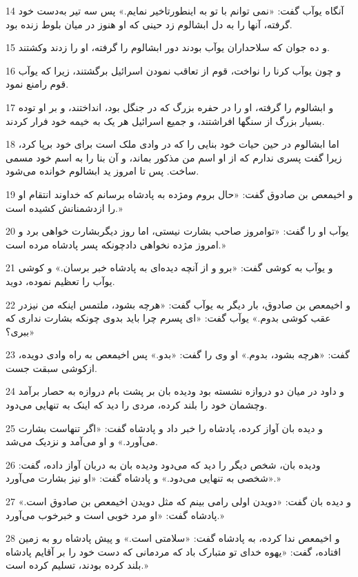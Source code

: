 \par 14 آنگاه یوآب گفت: «نمی توانم با تو به اینطورتاخیر نمایم.» پس سه تیر به‌دست خود گرفته، آنها را به دل ابشالوم زد حینی که او هنوز در میان بلوط زنده بود.
\par 15 و ده جوان که سلاحداران یوآب بودند دور ابشالوم را گرفته، او را زدند وکشتند.
\par 16 و چون یوآب کرنا را نواخت، قوم از تعاقب نمودن اسرائیل برگشتند، زیرا که یوآب قوم رامنع نمود.
\par 17 و ابشالوم را گرفته، او را در حفره بزرگ که در جنگل بود، انداختند، و بر او توده بسیار بزرگ از سنگها افراشتند، و جمیع اسرائیل هر یک به خیمه خود فرار کردند.
\par 18 اما ابشالوم در حین حیات خود بنایی را که در وادی ملک است برای خود برپا کرد، زیرا گفت پسری ندارم که از او اسم من مذکور بماند، و آن بنا را به اسم خود مسمی ساخت. پس تا امروز ید ابشالوم خوانده می‌شود.
\par 19 و اخیمعص بن صادوق گفت: «حال بروم ومژده به پادشاه برسانم که خداوند انتقام او را ازدشمنانش کشیده است.»
\par 20 یوآب او را گفت: «توامروز صاحب بشارت نیستی، اما روز دیگربشارت خواهی برد و امروز مژده نخواهی دادچونکه پسر پادشاه مرده است.»
\par 21 و یوآب به کوشی گفت: «برو و از آنچه دیده‌ای به پادشاه خبر برسان.» و کوشی یوآب را تعظیم نموده، دوید.
\par 22 و اخیمعص بن صادوق، بار دیگر به یوآب گفت: «هرچه بشود، ملتمس اینکه من نیزدر عقب کوشی بدوم.» یوآب گفت: «ای پسرم چرا باید بدوی چونکه بشارت نداری که ببری؟»
\par 23 گفت: «هرچه بشود، بدوم.» او وی را گفت: «بدو.» پس اخیمعص به راه وادی دویده، ازکوشی سبقت جست.
\par 24 و داود در میان دو دروازه نشسته بود ودیده بان بر پشت بام دروازه به حصار برآمد وچشمان خود را بلند کرده، مردی را دید که اینک به تنهایی می‌دود.
\par 25 و دیده بان آواز کرده، پادشاه را خبر داد و پادشاه گفت: «اگر تنهاست بشارت می‌آورد.» و او می‌آمد و نزدیک می‌شد.
\par 26 ودیده بان، شخص دیگر را دید که می‌دود ودیده بان به دربان آواز داده، گفت: «شخصی به تنهایی می‌دود.» و پادشاه گفت: «او نیز بشارت می‌آورد.»
\par 27 و دیده بان گفت: «دویدن اولی رامی بینم که مثل دویدن اخیمعص بن صادوق است.» پادشاه گفت: «او مرد خوبی است و خبرخوب می‌آورد.»
\par 28 و اخیمعص ندا کرده، به پادشاه گفت: «سلامتی است.» و پیش پادشاه رو به زمین افتاده، گفت: «یهوه خدای تو متبارک باد که مردمانی که دست خود را بر آقایم پادشاه بلند کرده بودند، تسلیم کرده است.»
